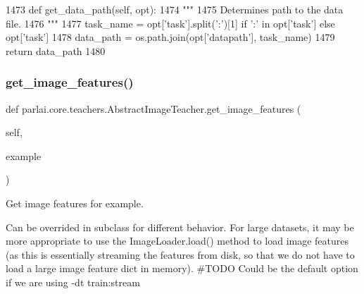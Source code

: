 \begin{DoxyCode}
1473     \textcolor{keyword}{def }get\_data\_path(self, opt):
1474         \textcolor{stringliteral}{"""}
1475 \textcolor{stringliteral}{        Determines path to the data file.}
1476 \textcolor{stringliteral}{        """}
1477         task\_name = opt[\textcolor{stringliteral}{'task'}].split(\textcolor{stringliteral}{':'})[1] \textcolor{keywordflow}{if} \textcolor{stringliteral}{':'} \textcolor{keywordflow}{in} opt[\textcolor{stringliteral}{'task'}] \textcolor{keywordflow}{else} opt[\textcolor{stringliteral}{'task'}]
1478         data\_path = os.path.join(opt[\textcolor{stringliteral}{'datapath'}], task\_name)
1479         \textcolor{keywordflow}{return} data\_path
1480 
\end{DoxyCode}
\mbox{\label{classparlai_1_1core_1_1teachers_1_1AbstractImageTeacher_a3e1f85a8de230d8733272bd1e860cd92}} 
\subsubsection{\texorpdfstring{get\+\_\+image\+\_\+features()}{get\_image\_features()}}
{\footnotesize\ttfamily def parlai.\+core.\+teachers.\+Abstract\+Image\+Teacher.\+get\+\_\+image\+\_\+features (\begin{DoxyParamCaption}\item[{}]{self,  }\item[{}]{example }\end{DoxyParamCaption})}

\begin{DoxyVerb}Get image features for example.

Can be overrided in subclass for different behavior. For large datasets, it may
be more appropriate to use the ImageLoader.load() method to load image features
(as this is essentially streaming the features from disk, so that we do not have
to load a large image feature dict in memory). #TODO Could be the default option
if we are using -dt train:stream
\end{DoxyVerb}
 

